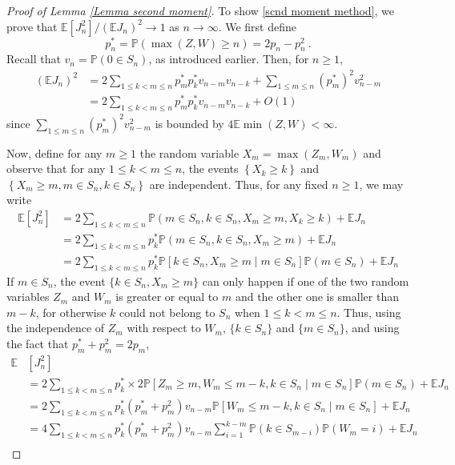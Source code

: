 \documentclass[10pt,a4paper]{amsart}
\newcommand{\E}{\mathbb{E}}
\newcommand{\PP}{\mathbb{P}}
\newcommand{\prob}[1]{\mathbb{P}\left( #1 \right)}
\newcommand{\procond}[2]{\mathbb{P}\mathopen{}\left[#1\middle|#2\right]}
\begin{document}
\begin{proof}[Proof of Lemma \ref{Lemma second moment}]
To show \eqref{scnd moment method}, we prove that $\E[J_n^2]/(\E J_n)^2\to 1$ as $n \to \infty$. We first define
$$
p_n^*=\PP(\max(Z,W)\ge n) = 2p_n - p_n^2~.
$$
Recall that $v_n = \PP(0 \in S_n)$, as introduced earlier. Then, for $n\ge 1$,
\begin{align}
    (\E J_n)^2 &= 2\sum_{1\le k<m\le n} p_m^* p_k^* v_{n-m}v_{n-k} + \sum_{1\le m \le n} (p_m^*)^2 v_{n-m}^2 \nonumber \\
    &= 2\sum_{1\le k<m\le n} p_m^* p_k^* v_{n-m}v_{n-k} + O(1)
\end{align}
since $\sum_{1\le m \le n} (p_m^*)^2 v_{n-m}^2$ is bounded by $4\E
\min (Z,W) <\infty$.

Now, define for any $m\ge 1$ the random variable $X_m=\max(Z_m, W_m)$ and observe that for any $1\le k < m \le n$, the events $\left\{ X_k\ge k\right\}$ and $\left\{ X_m\ge m, m\in S_n, k \in S_n\right\}$ are independent.
Thus, for any fixed $n\ge 1$, we may write
\begin{align}
    \E\left[ J_n^2\right] &= 2\sum_{1\le k < m \le n} \prob{m\in S_n, k\in S_n, X_m\ge m, X_k\ge k} + \E J_n \nonumber \\
    &= 2\sum_{1\le k < m \le n} p_k^*\prob{m\in S_n, k\in S_n, X_m\ge m} + \E J_n \nonumber \\
    &= 2\sum_{1\le k < m \le n} p_k^* \procond{k\in S_n, X_m \ge m}{m\in S_n}\prob{m\in S_n}+ \E J_n \nonumber 
\end{align}
If $m\in S_n$, the event $\{k\in S_n, X_m\ge m\}$ can only happen if one of the two random variables $Z_m$ and $W_m$ is greater or equal to $m$ and the other one is smaller than $m-k$, for otherwise $k$ could not belong to $S_n$ when $1\le k<m \le n$. Thus,
using the independence of $Z_m$ with respect to $W_m$, $\{k\in S_n\}$ and $\{m\in S_n\}$, and using the fact that 
$p_m^* + p_m^2 = 2p_m$,
\begin{align}
     \E&\left[ J_n^2\right] \\
     &= 2\sum_{1\le k < m \le n} p_k^* \times 2 \procond{Z_m\ge m, W_m\le m-k , k\in S_n}{m\in S_n}\prob{m\in S_n}+ \E J_n \nonumber \\
     &= 2\sum_{1\le k < m \le n} p_k^* (p_m^*+p_m^2)v_{n-m}\procond{W_m\le m-k , k\in S_n}{m\in S_n}+ \E J_n \nonumber \\
    &= 4\sum_{1\le k < m \le n} p_k^* (p_m^*+p_m^2)v_{n-m}\sum_{i=1}^{k-m}\prob{k\in S_{m-i}}\prob{W_m=i}+ \E J_n \nonumber \\

\end{align}
\end{proof}
\end{document}
